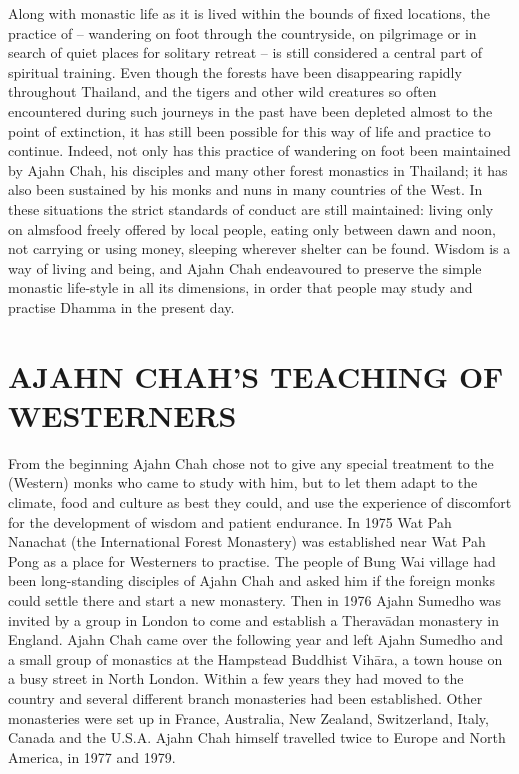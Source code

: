 Along with monastic life as it is lived within the bounds of fixed locations, the practice of  -- wandering on foot through the countryside, on pilgrimage or in search of quiet places for solitary retreat -- is still considered a central part of spiritual training. Even though the forests have been disappearing rapidly throughout Thailand, and the tigers and other wild creatures so often encountered during such  journeys in the past have been depleted almost to the point of extinction, it has still been possible for this way of life and practice to continue. Indeed, not only has this practice of wandering on foot been maintained by Ajahn Chah, his disciples and many other forest monastics in Thailand; it has also been sustained by his monks and nuns in many countries of the West. In these situations the strict standards of conduct are still maintained: living only on almsfood freely offered by local people, eating only between dawn and noon, not carrying or using money, sleeping wherever shelter can be found. Wisdom is a way of living and being, and Ajahn Chah endeavoured to preserve the simple monastic life-style in all its dimensions, in order that people may study and practise Dhamma in the present day.

\section*{AJAHN CHAH'S TEACHING OF WESTERNERS}

\vspace*{0.4\baselineskip}
From the beginning Ajahn Chah chose not to give any special treatment to the  (Western) monks who came to study with him, but to let them adapt to the climate, food and culture as best they could, and use the experience of discomfort for the development of wisdom and patient endurance. In 1975 Wat Pah Nanachat (the International Forest Monastery) was established near Wat Pah Pong as a place for Westerners to practise. The people of Bung Wai village had been long-standing disciples of Ajahn Chah and asked him if the foreign monks could settle there and start a new monastery. Then in 1976 Ajahn Sumedho was invited by a group in London to come and establish a Therav\=adan monastery in England. Ajahn Chah came over the following year and left Ajahn Sumedho and a small group of monastics at the Hampstead Buddhist Vih\=ara, a town house on a busy street in North London. Within a few years they had moved to the country and several different branch monasteries had been established. Other monasteries were set up in France, Australia, New Zealand, Switzerland, Italy, Canada and the U.S.A. Ajahn Chah himself travelled twice to Europe and North America, in 1977 and 1979.

